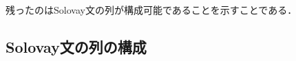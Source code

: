 \documentclass{jlreq}
\begin{document}
残ったのはSolovay文の列が構成可能であることを示すことである．

\subsection{Solovay文の列の構成}

\printbibliography

\printindex
\end{document}
